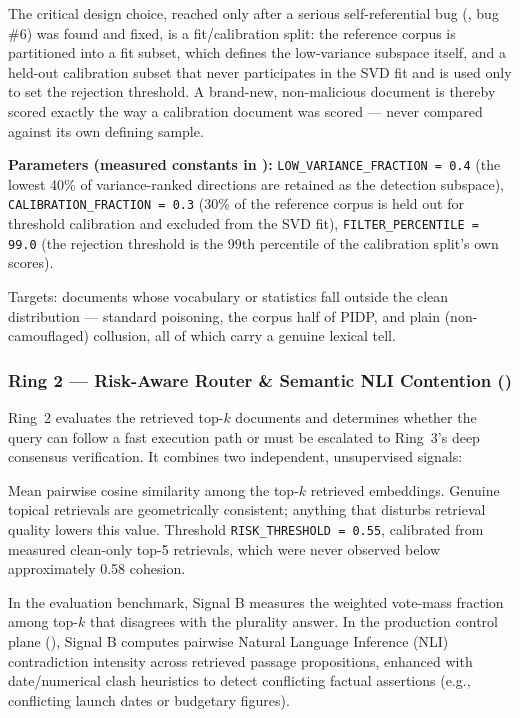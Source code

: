 The critical design choice, reached only after a serious self-referential
bug (, bug \#6) was found and fixed, is a
fit/calibration split: the reference corpus is partitioned into a fit
subset, which defines the low-variance subspace itself, and a held-out
calibration subset that never participates in the SVD fit and is used
only to set the rejection threshold. A brand-new, non-malicious document
is thereby scored exactly the way a calibration document was scored ---
never compared against its own defining sample.

\textbf{Parameters (measured constants in ):}
\texttt{LOW\_VARIANCE\_FRACTION = 0.4} (the lowest 40\% of variance-ranked
directions are retained as the detection subspace), \texttt{CALIBRATION\_FRACTION
= 0.3} (30\% of the reference corpus is held out for threshold
calibration and excluded from the SVD fit), \texttt{FILTER\_PERCENTILE =
99.0} (the rejection threshold is the 99th percentile of the calibration
split's own scores).

Targets: documents whose vocabulary or statistics fall outside the clean
distribution --- standard poisoning, the corpus half of PIDP, and plain
(non-camouflaged) collusion, all of which carry a genuine lexical tell.

\subsubsection{Ring 2 --- Risk-Aware Router \& Semantic NLI Contention ()}
\label{sec:ring2}

Ring~2 evaluates the retrieved top-$k$ documents and determines whether
the query can follow a fast execution path or must be escalated to Ring~3's
deep consensus verification. It combines two independent, unsupervised
signals:

\begin{description}[leftmargin=0pt,style=nextline,font=\bfseries\color{navy}]
\item[Signal A --- Embedding cohesion.] Mean pairwise cosine similarity
  among the top-$k$ retrieved embeddings. Genuine topical retrievals are
  geometrically consistent; anything that disturbs retrieval quality
  lowers this value. Threshold \texttt{RISK\_THRESHOLD = 0.55}, calibrated
  from measured clean-only top-5 retrievals, which were never observed
  below approximately 0.58 cohesion.
\item[Signal B --- Semantic NLI Contention and Answer Contention.] In the
  evaluation benchmark, Signal B measures the weighted vote-mass fraction
  among top-$k$ that disagrees with the plurality answer. In the production
  control plane (), Signal B computes
  pairwise Natural Language Inference (NLI) contradiction intensity across
  retrieved passage propositions, enhanced with date/numerical clash
  heuristics to detect conflicting factual assertions (e.g., conflicting
  launch dates or budgetary figures).
\end{description}

